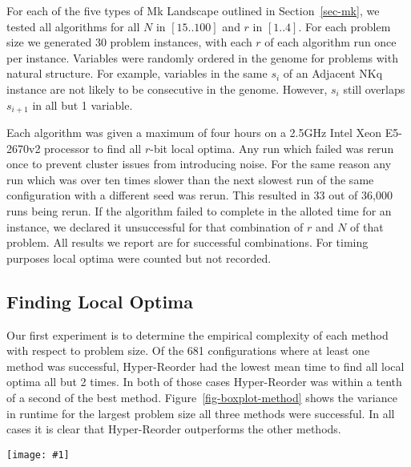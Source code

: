 \documentclass[runningheads,a4paper]{llncs}
\newcommand{\includegraphicsfit}[1]
{\texttt{[image: \#1]}}
\begin{document}
For each of the five types of Mk Landscape outlined in Section~\ref{sec-mk}, we tested all
algorithms for all $N$ in $[15..100]$ and $r$ in $[1..4]$. For each problem size we generated
30 problem instances, with each $r$ of each algorithm run once per instance. Variables were randomly
ordered in the genome for problems with natural structure. For example, variables in the same $s_i$
of an Adjacent NKq instance are not likely to be consecutive in the genome. However, $s_i$ still overlaps
$s_{i+1}$ in all but 1 variable.

Each algorithm was given a maximum of four hours on a 2.5GHz Intel Xeon E5-2670v2 processor to find
all $r$-bit local optima. Any run which failed was rerun once to prevent cluster issues from introducing
noise. For the same reason any run which was over ten times slower than the next slowest run of the
same configuration with a different seed was rerun. This resulted in 33 out of 36,000 runs being rerun.
If the algorithm failed to complete in the alloted time for an instance,
we declared it unsuccessful for that combination of $r$ and $N$ of that problem. All results
we report are for successful combinations. For timing purposes local optima were counted but not
recorded.

\subsection{Finding Local Optima}
Our first experiment is to determine the empirical complexity of each method with respect to problem size.
Of the 681 configurations where at least one method was successful, Hyper-Reorder had the lowest
mean time to find all local optima all but 2 times. In both of those cases Hyper-Reorder was within a tenth of a second
of the best method.
Figure~\ref{fig-boxplot-method} shows the variance in runtime for the largest problem size all three methods
were successful. In all cases it is clear that Hyper-Reorder outperforms the other methods.

\begin{figure*}
  \centering
  \includegraphicsfit{boxplot-method}
  \caption{Comparison of completion time variance for the largest size of each problem
           where all three methods were successful at finding all 1-bit local optima.}
  \label{fig-boxplot-method}
\end{figure*}
\end{document}
